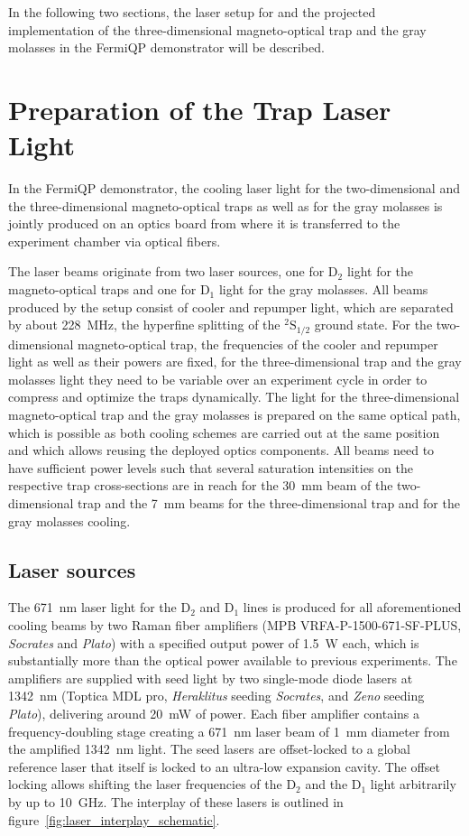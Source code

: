 In the following two sections, the laser setup for and the projected implementation of the three-dimensional magneto-optical trap and the gray molasses in the FermiQP demonstrator will be described.


\section{Preparation of the Trap Laser Light}\label{ch:light_preparation}
In the FermiQP demonstrator, the cooling laser light for the two-dimensional and the three-dimensional magneto-optical traps as well as for the gray molasses is jointly produced on an optics board from where it is transferred to the experiment chamber via optical fibers.

The laser beams originate from two laser sources, one for D$_2$ light for the magneto-optical traps and one for D$_1$ light for the gray molasses. All beams produced by the setup consist of cooler and repumper light, which are separated by about \SI{228}{\mega\hertz}, the hyperfine splitting of the $^2\text{S}_{1/2}$ ground state. For the two-dimensional magneto-optical trap, the frequencies of the cooler and repumper light as well as their powers are fixed, for the three-dimensional trap and the gray molasses light they need to be variable over an experiment cycle in order to compress and optimize the traps dynamically. The light for the three-dimensional magneto-optical trap and the gray molasses is prepared on the same optical path, which is possible as both cooling schemes are carried out at the same position and which allows reusing the deployed optics components. All beams need to have sufficient power levels such that several saturation intensities on the respective trap cross-sections are in reach for the \SI{30}{\milli\meter} beam of the two-dimensional trap and the \SI{7}{\milli\meter} beams for the three-dimensional trap  and for the gray molasses cooling.

\subsection*{Laser sources}
The \SI{671}{\nano\meter} laser light for the D$_2$ and D$_1$ lines is produced for all aforementioned cooling beams by two Raman fiber amplifiers (MPB VRFA-P-1500-671-SF-PLUS, \textit{Socrates} and \textit{Plato}) with a specified output power of \SI{1.5}{\watt} each, which is substantially more than the optical power available to previous experiments. The amplifiers are supplied with seed light by two single-mode diode lasers at \SI{1342}{\nano\meter} (Toptica MDL pro, \textit{Heraklitus} seeding \textit{Socrates}, and \textit{Zeno} seeding \textit{Plato}), delivering around \SI{20}{\milli\watt} of power. Each fiber amplifier contains a frequency-doubling stage creating a \SI{671}{\nano\meter} laser beam of \SI{1}{\milli\meter} diameter from the amplified \SI{1342}{\nano\meter} light. The seed lasers are offset-locked to a global reference laser that itself is locked to an ultra-low expansion cavity. The offset locking allows shifting the laser frequencies of the D$_2$ and the D$_1$ light arbitrarily by up to \SI[]{10}{\giga\hertz}. The interplay of these lasers is outlined in figure~\ref{fig:laser_interplay_schematic}.

